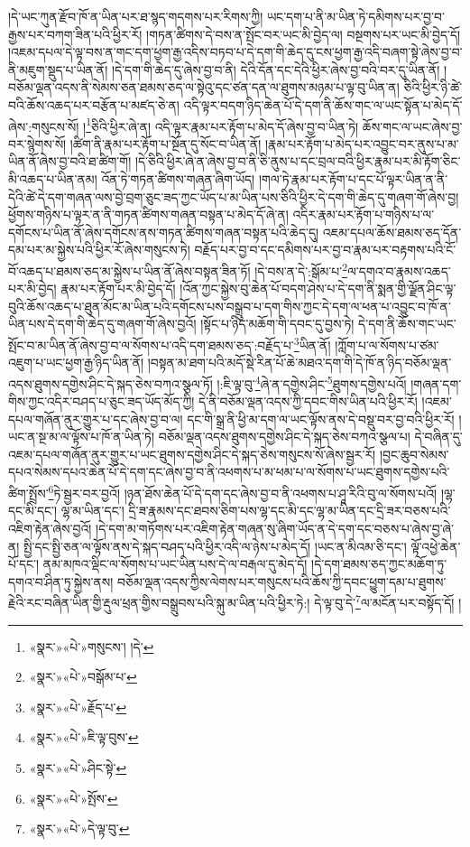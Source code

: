 །དེ་ཡང་ཀུན་རྫོབ་ཁོ་ན་ཡིན་པར་ཐ་སྙད་གདགས་པར་རིགས་ཀྱི། ཡང་དག་པ་ནི་མ་ཡིན་ཏེ་དམིགས་པར་བྱ་བ་རྒྱས་པར་བཀག་ཟིན་པའི་ཕྱིར་རོ། །གཏན་ཚིགས་དེ་བས་ན་སྤོང་བར་ཡང་མི་བྱེད་ལ། བསྔགས་པར་ཡང་མི་བྱེད་དོ། །འཇམ་དཔལ་དེ་ལྟ་བས་ན་གང་དག་ཕྱག་རྒྱ་འདིས་བཏབ་པ་དེ་དག་གི་ཆེད་དུ་ངས་ཕྱག་རྒྱ་འདི་བཞག་སྟེ་ཞེས་བྱ་བ་ནི་མཇུག་སྡུད་པ་ཡིན་ནོ། །དེ་དག་གི་ཆེད་དུ་ཞེས་བྱ་བ་ནི། དེའི་དོན་དང་དེའི་ཕྱིར་ཞེས་བྱ་བའི་བར་དུ་ཡིན་ནོ། །བཅོམ་ལྡན་འདས་ནི་སེམས་ཅན་ཐམས་ཅད་ལ་སྟེའུ་དང་ཙན་དན་ལ་ཐུགས་མཉམ་པ་ལྟ་བུ་ཡིན་ན། ཅིའི་ཕྱིར་ཉི་ཚེ་བའི་ཆོས་འཆད་པར་བརྩོན་པ་མཛད་ཅེ་ན། འདི་ལྟར་བདག་ཉིད་ཆེན་པོ་དེ་དག་ནི་ཆོས་གང་ལ་ཡང་སྟོན་པ་མེད་དོ་ཞེས་:གསུངས་སོ། །\footnote{«སྣར་»«པེ་»གསུངས་། །དེ་}ཅིའི་ཕྱིར་ཞེ་ན། འདི་ལྟར་རྣམ་པར་རྟོག་པ་མེད་དོ་ཞེས་བྱ་བ་ཡིན་ཏེ། ཆོས་གང་ལ་ཡང་ཞེས་བྱ་བར་སྙེགས་སོ། །ཚིག་ནི་རྣམ་པར་རྟོག་པ་སྔོན་དུ་སོང་བ་ཡིན་ནོ། །རྣམ་པར་རྟོག་པ་མེད་པར་འབྱུང་བར་ནུས་པ་མ་ཡིན་ནོ་ཞེས་བྱ་བའི་ཐ་ཚིག་གོ། །དེ་ཅིའི་ཕྱིར་ཞེ་ན་ཞེས་བྱ་བ་ནི་ཅི་ནུས་པ་དང་བྲལ་བའི་ཕྱིར་རྣམ་པར་མི་རྟོག་ཅིང་མི་འཆད་པ་ཡིན་ནམ། འོན་ཏེ་གཏན་ཚིགས་གཞན་ཞིག་ཡོད། །གལ་ཏེ་རྣམ་པར་རྟོག་པ་དང་པོ་ལྟར་ཡིན་ན་ནི་དེའི་ཚེ་དེ་དག་གཞན་ལས་བྱེ་བྲག་ཅུང་ཟད་ཀྱང་ཡོད་པ་མ་ཡིན་པས་ཅིའི་ཕྱིར་དེ་དག་གི་ཆེད་དུ་གཞག་གོ་ཞེས་བྱ། ཕྱོགས་གཉིས་པ་ལྟར་ན་ནི་གཏན་ཚིགས་གཞན་བསྟན་པ་མེད་དོ་ཞེ་ན། འདིར་རྣམ་པར་རྟོག་པ་གཉིས་པ་ལ་དགོངས་པ་ཡིན་ནོ་ཞེས་དགོངས་ནས་གཏན་ཚིགས་གཞན་བསྟན་པའི་ཆེད་དུ། འཇམ་དཔལ་ཆོས་ཐམས་ཅད་དོན་དམ་པར་མ་སྐྱེས་པའི་ཕྱིར་རོ་ཞེས་གསུངས་ཏེ། བརྗོད་པར་བྱ་བ་དང་དམིགས་པར་བྱ་བ་རྣམ་པར་བརྟགས་པའི་ངོ་བོ་འཆད་པ་ཐམས་ཅད་མ་སྐྱེས་པ་ཡིན་ནོ་ཞེས་བསྟན་ཟིན་ཏོ། །དེ་བས་ན་དེ་:སྒོམ་པ་\footnote{«སྣར་»«པེ་»བསྒོམ་པ་}ལ་དགའ་བ་རྣམས་འཆད་པར་མི་བྱེད། རྣམ་པར་རྟོག་པར་མི་བྱེད་དོ། །འོན་ཀྱང་སྐྱེས་བུ་ཆེན་པོ་བདག་ཤེས་པ་དེ་དག་ནི་སྨན་གྱི་ལྗོན་ཤིང་ལྟ་བུའི་ཆོས་འཆད་པ་ཐུན་མོང་མ་ཡིན་པའི་དགོངས་པས་བསྒྲུབ་པ་དག་གིས་ཀྱང་དེ་དག་ལ་ཕན་པ་འབྱུང་བ་ཁོ་ན་ཡིན་པས་དེ་དག་གི་ཆེད་དུ་གཞག་གོ་ཞེས་བྱའོ། །སྟོང་པ་ཉིད་མཆོག་གི་དབང་དུ་བྱས་ཏེ། དེ་དག་ནི་ཆོས་གང་ཡང་སྤོང་བ་མ་ཡིན་ནོ་ཞེས་བྱ་བ་ལ་སོགས་པ་འདི་དག་ཐམས་ཅད་:བརྗོད་པ་\footnote{«སྣར་»«པེ་»རྗོད་པ་}ཡིན་ནོ། །ཀློག་པ་ལ་སོགས་པ་ཙམ་འཇུག་པ་ཡང་ཕྱག་རྒྱ་ཉིད་ཡིན་ནོ། །བསྟན་མ་ཐག་པའི་མདོ་སྡེ་རིན་པོ་ཆེ་མཐའ་དག་གི་དེ་ཁོ་ན་ཉིད་བཅོམ་ལྡན་འདས་ཐུགས་དགྱེས་ཤིང་དེ་སྐད་ཅེས་བཀའ་སྩལ་ཏོ། །:ཇི་ལྟ་བུ་\footnote{«སྣར་»«པེ་»ཇི་ལྟ་བུས་}ཞེ་ན་དགྱེས་ཤིང་\footnote{«སྣར་»«པེ་»ཤིང་སྟེ་}ཐུགས་དགྱེས་པའོ། །གཞན་དག་གིས་ཀྱང་འདིར་བཤད་པ་ཅུང་ཟད་ཡོད་མོད་ཀྱི། དེ་ནི་བཅོམ་ལྡན་འདས་ཀྱི་དབང་གིས་ཡིན་པའི་ཕྱིར་རོ། །འཇམ་དཔལ་གཞོན་ནུར་གྱུར་པ་དང་ཞེས་བྱ་བ་ལ། དང་གི་སྒྲ་ནི་ཕྱི་མ་དག་ལ་ཡང་ལྟོས་ནས་དེ་བསྡུ་བར་བྱ་བའི་ཕྱིར་རོ། །ཡང་ན་སྔ་མ་ལ་ལྟོས་པ་ཁོ་ན་ཡིན་ཏེ། བཅོམ་ལྡན་འདས་ཐུགས་དགྱེས་ཤིང་དེ་སྐད་ཅེས་བཀའ་སྩལ་པ། དེ་བཞིན་དུ་འཇམ་དཔལ་གཞོན་ནུར་གྱུར་པ་ཡང་ཐུགས་དགྱེས་ཤིང་དེ་སྐད་ཅེས་གསུངས་སོ་ཞེས་སྦྱར་རོ། །བྱང་ཆུབ་སེམས་དཔའ་སེམས་དཔའ་ཆེན་པོ་དེ་དག་དང་ཞེས་བྱ་བ་ནི་འཕགས་པ་མ་ཕམ་པ་ལ་སོགས་པ་ཡང་ཐུགས་དགྱེས་པའི་ཚིག་སྤྲོས་\footnote{«སྣར་»«པེ་»སྤོས་}ཏེ་སྦྱར་བར་བྱའོ། །ཉན་ཐོས་ཆེན་པོ་དེ་དག་དང་ཞེས་བྱ་བ་ནི་འཕགས་པ་ཤཱ་རིའི་བུ་ལ་སོགས་པའོ། །ལྷ་དང་མི་དང་། ལྷ་མ་ཡིན་དང་། དྲི་ཟ་རྣམས་དང་ཐབས་ཅིག་པས་ལྷ་དང་མི་དང་ལྷ་མ་ཡིན་དང་དྲི་ཟར་བཅས་པའི་འཇིག་རྟེན་ཞེས་བྱའོ། །དེ་དག་མ་གཏོགས་པར་འཇིག་རྟེན་གཞན་སུ་ཞིག་ཡོད་ན་དེ་དག་དང་བཅས་པ་ཞེས་བྱ་ཞེ་ན། སྤྱི་དང་སྤྱི་ཅན་ལ་ལྟོས་ནས་དེ་སྐད་བཤད་པའི་ཕྱིར་འདི་ལ་ཉེས་པ་མེད་དོ། །ཡང་ན་མིའམ་ཅི་དང་། ལྟོ་འཕྱེ་ཆེན་པོ་དང་། ནམ་མཁའ་ལྡིང་ལ་སོགས་པ་ཡང་ཡིན་པས་དེ་ལ་བརྒལ་དུ་མེད་དོ། །དེ་དག་ཐམས་ཅད་ཀྱང་མཆོག་ཏུ་དགའ་བ་ཤིན་ཏུ་སྐྱེས་ནས། བཅོམ་ལྡན་འདས་ཀྱིས་ལེགས་པར་གསུངས་པའི་ཆོས་ཀྱི་དབང་ཕྱུག་དམ་པ་ཐུགས་རྗེའི་རང་བཞིན་ཡིན་གྱི་རྡུལ་ཕྲན་གྱིས་བསྒྲུབས་པའི་སྐུ་མ་ཡིན་པའི་ཕྱིར་ཏེ:། དེ་ལྟ་བུ་དེ་\footnote{«སྣར་»«པེ་»དེ་ལྟ་བུ་}ལ་མངོན་པར་བསྟོད་དོ། །
